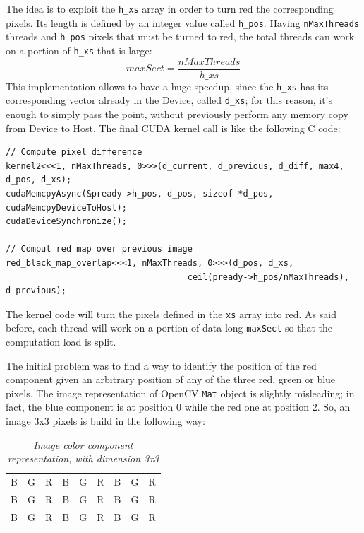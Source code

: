 \documentclass[paper=a4, fontsize=10pt]{scrartcl}	%
\begin{document}
	The idea is to exploit the \texttt{h\_xs} array in order to turn red the corresponding pixels. Its length is defined by an integer value called \texttt{h\_pos}. 
	Having \texttt{nMaxThreads} threads and \texttt{h\_pos} pixels that must be turned to red, the total threads can work on a portion of \texttt{h\_xs} that is large:
	\[
		maxSect = \frac{nMaxThreads}{h\_xs}
	\]
	This implementation allows to have a huge speedup, since the \texttt{h\_xs} has its corresponding vector already in the Device, called \texttt{d\_xs}; for this reason, it's enough to simply pass the point, without previously perform any memory copy from Device to Host. \newline
	The final CUDA kernel call is like the following C code:
	\begin{lstlisting}[style=CStyle]
// Compute pixel difference		
kernel2<<<1, nMaxThreads, 0>>>(d_current, d_previous, d_diff, max4, d_pos, d_xs);
cudaMemcpyAsync(&pready->h_pos, d_pos, sizeof *d_pos, cudaMemcpyDeviceToHost);
cudaDeviceSynchronize();		

// Comput red map over previous image		
red_black_map_overlap<<<1, nMaxThreads, 0>>>(d_pos, d_xs,
									ceil(pready->h_pos/nMaxThreads), d_previous);\end{lstlisting}
	
	The kernel code will turn the pixels defined in the \texttt{xs} array into red. As said before, each thread will work on a portion of data long \texttt{maxSect} so that the computation load is split. 
	
	The initial problem was to find a way to identify the position of the red component given an arbitrary position of any of the three red, green or blue pixels. The image representation of OpenCV \texttt{Mat} object is slightly misleading; in fact, the blue component is at position 0 while the red one at position 2. So, an image 3x3 pixels is build in the following way:
	\begin{table}[H]
		\centering
		\begin{tabular}{ |c|c|c|c|c|c|c|c|c| } 
			\hline
			B & G & R & B & G & R & B & G & R \\
			\hdashline
			B & G & R & B & G & R & B & G & R \\
			\hdashline
			B & G & R & B & G & R & B & G & R \\
			\hline
		\end{tabular}
		\caption{\textit{Image color component representation, with dimension 3x3}}
	\end{table}
	
\end{document}

